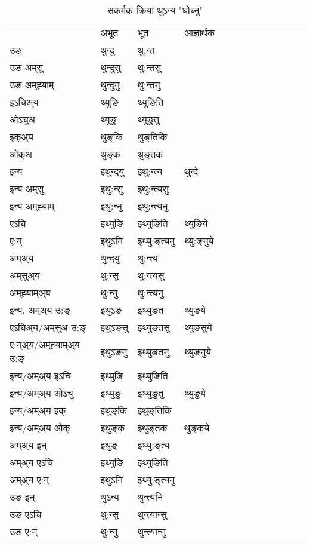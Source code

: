 \begin{table}[H]
\centering
\caption{\label{uŋt.vt} सकर्मक क्रिया  थुऽन्य  "घोच्नु"  }
\begin{tabular}{l|l|l|l|l|l|l|l|l|l|l|l|l}  \toprule
&अभूत & भूत & आज्ञार्थक \\ 
उङ &थुन्दु &थु:न्त \\ 
उङ अम्‌सु&थुन्दुसु &थु:न्तसु \\ 
उङ अम्‌ह्‍याम्&थुन्दुनु &थु:न्तनु \\ 
इऽचिअ्य &थ्युङि &थ्युङिति   \\ 
ओऽचुअ        &थ्युङु &थ्युङुतु   \\ 
इक्अ्य&थुङ्‌कि &थुङ्‌तिकि   \\ 
ओक्अ &थुङ्‌क &थुङ्‌तक   \\ 
इन्य & इथुन्द्‌यु  & इथु:न्त्य &थुन्दे  \\ 
इन्य अम्‌सु& इथु:न्सु  & इथु:न्त्यसु   \\ 
इन्य अम्‌ह्‍याम्& इथु:न्‍नु  & इथु:न्त्यनु   \\ 
एऽचि & इथ्युङि & इथ्युङिति &थ्युङिये    \\ 
ए:न् & इथुऽनि  & इथ्यु:ङ्‌त्यनु &थ्यु:ङ्‌नुये  \\ 
अम्अ्य & थुन्द्‌यु  & थु:न्त्य  \\ 
अम्‌सुअ्य & थु:न्सु & थु:न्त्यसु  \\ 
अम्‌ह्‍याम्अ्य & थु:न्‍नु  & थु:न्त्यनु \\ 
\midrule
इन्य, अम्अ्य उ:ङ्‌ &इथुऽङ &इथ्युङत &थ्युङये \\ 
एऽचिअ्य/अम्‌सुअ उ:ङ्‌ &इथुऽङसु &इथ्युङतसु &थ्युङसुये \\ 
ए:न्अ्य/अम्‌ह्‍याम्अ्य उ:ङ्‌ &इथुऽङनु &इथ्युङतनु &थ्युङनुये \\ 
इन्य/अम्अ्य इऽचि &इथ्युङि &इथ्युङिति    \\ 
इन्य/अम्अ्य ओऽचु &इथ्युङु &इथ्युङुतु  &थ्युङुये  \\ 
इन्य/अम्अ्य इक् &इथुङ्‌कि &इथुङ्‌तिकि   \\ 
इन्य/अम्अ्य ओक् &इथुङ्‌क &इथुङ्‌तक  &थुङ्‌कये  \\ 
अम्अ्य इन् & इथुङ्‌ & इथ्यु:ङ्‌त्य   \\ 
अम्अ्य एऽचि & इथ्युङि & इथ्युङिति    \\ 
अम्अ्य ए:न् & इथुऽनि  & इथ्यु:ङ्‌त्यनु  \\ 
\midrule
उङ इन् & थुऽन्य  & थुन्त्यनि  \\ 
उङ एऽचि & थु:न्सु  & थुन्त्यान्सु   \\ 
उङ ए:न्& थु:न्‍नु  & थुन्त्यान्‍नु   \\ 
\bottomrule
\end{tabular}
\end{table}


